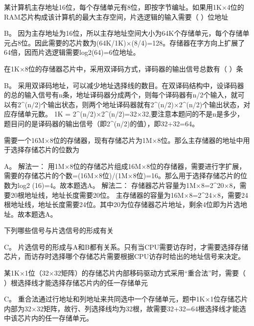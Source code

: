 \question 某计算机主存地址16位，每个存储单元有8位，即按字节编址。如果用1K×4位的RAM芯片构成该计算机的最大主存空间，片选逻辑的输入需要（
）位地址
\par{}
\begin{solution}B。
因为主存地址为16位，所以主存地址空间大小为64K个存储单元，每个存储单元占8位。因此需要的芯片数为(64K/1K)×(8/4)=128。存储器在字方向上扩展了64倍，因而片选逻辑需要log2(64)=6位地址。
\end{solution}
\question 在1K×8位的存储器芯片中，采用双译码方式，译码器的输出信号总数有（ ）条
\par{}
\begin{solution}B。
采用双译码地址，可以减少地址选择线的数目。在双译码结构中，设译码器的总的输入信号有n条，地址译码器分成两个，则每个译码器有n/2个输入，就可以有2\^{}(n/2)个输出状态，则两个地址译码器就有2\^{}(n/2)×2\^{}(n/2)个输出状态，对应存储单元数。
1K =
2\^{}(n/2)×2\^{}(n/2)=32×32,要注意本题问的不是n是多少，题目问的是译码器的输出信号（即2\^{}(n/2)的值），即32+32=64。
\end{solution}
\question 需要一个16M×8位的存储器，现有存储芯片为1M×8位。那么主存储器的地址中用于选择存储芯片的位数为
\par{}
\begin{solution}A。 解法一：
用1M×8位的存储芯片组成16M×8位的存储器，需要进行字扩展，需要的存储芯片的个数=(16M×8位)/(1M×8位)=16。那么用于选择存储芯片的位数为log2
(16)=4。故本题选A。 解法二：
存储器芯片容量为1M×8=2\^{}20×8，需要20根地址线，地址长度需要20位。
主存储器的容量为16M×8=2\^{}24×8，需要24根地址线，地址长度需要24位。其中20为位存储器芯片地址，剩余4位即为片选地址。故本题选A。
\end{solution}
\question 下列哪些信号与片选信号的形成有关
\par{}
\begin{solution}C。
片选信号的形成与A和B都有关系。只有当CPU需要访存时，才需要选择存储芯片，而访存时选择哪个存储芯片需要根据CPU访存时给出的地址信号来决定。
\end{solution}
\question 某1K×1位（32×32矩阵）的存储芯片内部移码驱动方式采用``重合法''时，需要（
）根选择线才能选择存储芯片内的任一存储单元
\par{}
\begin{solution}C。
重合法通过行地址和列地址来共同选中一个存储单元，题中1K×1位存储芯片内部为32×32矩阵，故行、列选择线均为32根，故需要32+32=64根选择线才能选中该芯片内的任一存储单元。
\end{solution}
